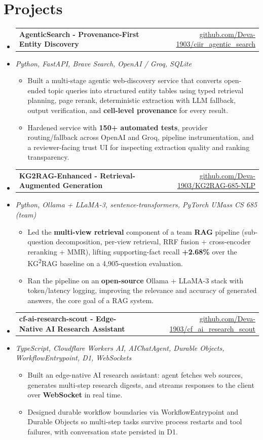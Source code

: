 \documentclass[letterpaper,10pt]{article}
\makeatletter
\newcommand{\resumeItem}[1]{
  \item\small{#1\vspace{-1pt}}
}
\newcommand{\resumeProjectHeading}[2]{
    \item
    \begin{tabular*}{0.985\textwidth}[t]{l@{\extracolsep{\fill}}r}
      \small\textbf{#1} & \small #2 \\
    \end{tabular*}\vspace{-5pt}
}
\newcommand{\resumeProjectSubheading}[1]{
  \vspace{-2pt}\item[] {\small\textcolor{ResumeSlate}{\emph{#1}}}\vspace{-3pt}
}
\newcommand{\resumeSubHeadingListStart}{\begin{itemize}[leftmargin=0.0in, label={}, itemsep=2pt, topsep=2pt]}
\newcommand{\resumeSubHeadingListEnd}{\end{itemize}}
\newcommand{\resumeItemListStart}{\begin{itemize}[leftmargin=0.18in, itemsep=2pt, topsep=1pt]}
\newcommand{\resumeItemListEnd}{\end{itemize}\vspace{-4pt}}
\makeatother
\begin{document}
\section{Projects}
\resumeSubHeadingListStart
  \resumeProjectHeading
    {AgenticSearch - Provenance-First Entity Discovery}
    {\href{https://github.com/Deva-1903/ciir_agentic_search}{github.com/Deva-1903/ciir\_agentic\_search}}
  \resumeProjectSubheading{Python, FastAPI, Brave Search, OpenAI / Groq, SQLite}
    \resumeItemListStart
      \resumeItem{Built a multi-stage agentic web-discovery service that converts open-ended topic queries into structured entity tables using typed retrieval planning, page rerank, deterministic extraction with LLM fallback, output verification, and \textbf{cell-level provenance} for every result.}
      \resumeItem{Hardened service with \textbf{150+ automated tests}, provider routing/fallback across OpenAI and Groq, pipeline instrumentation, and a reviewer-facing trust UI for inspecting extraction quality and ranking transparency.}
    \resumeItemListEnd
  \resumeProjectHeading
    {KG2RAG-Enhanced - Retrieval-Augmented Generation}
    {\href{https://github.com/Deva-1903/KG2RAG-685-NLP}{github.com/Deva-1903/KG2RAG-685-NLP}}
  \resumeProjectSubheading{Python, Ollama + LLaMA-3, sentence-transformers, PyTorch \enspace\textbar\enspace UMass CS 685 (team)}
    \resumeItemListStart
      \resumeItem{Led the \textbf{multi-view retrieval} component of a team \textbf{RAG} pipeline (sub-question decomposition, per-view retrieval, RRF fusion + cross-encoder reranking + MMR), lifting supporting-fact recall \textbf{+2.68\%} over the KG\textsuperscript{2}RAG baseline on a 4,905-question evaluation.}
      \resumeItem{Ran the pipeline on an \textbf{open-source} Ollama + LLaMA-3 stack with token/latency logging, improving the relevance and accuracy of generated answers, the core goal of a RAG system.}
    \resumeItemListEnd
  \resumeProjectHeading
    {cf-ai-research-scout - Edge-Native AI Research Assistant}
    {\href{https://github.com/Deva-1903/cf_ai_research_scout}{github.com/Deva-1903/cf\_ai\_research\_scout}}
  \resumeProjectSubheading{TypeScript, Cloudflare Workers AI, AIChatAgent, Durable Objects, WorkflowEntrypoint, D1, WebSockets}
    \resumeItemListStart
      \resumeItem{Built an edge-native AI research assistant: agent fetches web sources, generates multi-step research digests, and streams responses to the client over \textbf{WebSocket} in real time.}
      \resumeItem{Designed durable workflow boundaries via WorkflowEntrypoint and Durable Objects so multi-step tasks survive process restarts and tool failures, with conversation state persisted in D1.}
    \resumeItemListEnd
\resumeSubHeadingListEnd
\vspace{-4pt}
\end{document}

